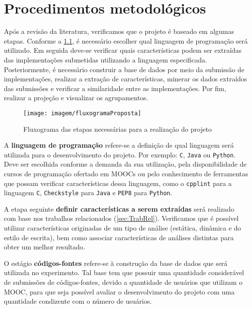 \chapter{Procedimentos metodológicos}
\label{chap:Proposta}

	Após a revisão da literatura, verificamos que o projeto é baseado em algumas etapas.
	Conforme a \cref{fig:fluxogramaProposta}, é necessário escolher qual linguagem de programação
	será utilizado. Em seguida deve-se verificar quais características podem ser extraídas
	das implementações submetidas utilizando a linguagem especificada. Posteriormente, é
	necessário construir a base de dados por meio da submissão de implementações, realizar
	a extração de características, minerar os dados extraídos das submissões e verificar a
	similaridade entre as implementações. Por fim, realizar a projeção e visualizar os
	agrupamentos.

	\begin{figure}[h]
		\centering
		\texttt{[image: imagem/fluxogramaProposta]}
		\caption{Fluxograma das etapas necessárias para a realização do projeto}
		\label{fig:fluxogramaProposta}
	\end{figure}

	A \textbf{linguagem de programação} refere-se a definição de qual linguagem será
	utilizada para o desenvolvimento do projeto. Por exemplo: \texttt{C}, \texttt{Java}
	ou \texttt{Python}. Deve ser escolhida conforme a demanda da sua utilização, pela
	disponibilidade de cursos de programação ofertado em \acs{MOOC}s ou pelo conhecimento de
	ferramentas que possam verificar características dessa linguagem, como o
	\texttt{cpplint} para a linguagem \texttt{C}, \texttt{Checkstyle} para
	\texttt{Java} e \texttt{PEP8} para \texttt{Python}.

	A etapa seguinte \textbf{definir características a serem extraídas} será realizado
	com base nos trabalhos relacionados (\cref{sec:TrabRel}). Verificamos que é
	possível utilizar características originadas de um tipo de análise (estática,
	dinâmica e do estilo de escrita), bem como associar características de análises
	distintas para obter um melhor resultado.
	
	O estágio \textbf{códigos-fontes} refere-se à construção da base de dados que será
	utilizada no experimento. Tal base tem que possuir uma quantidade considerável de
	submissões de códigos-fontes, devido a quantidade de usuários que utilizam o \acs{MOOC},
	para que seja possível avaliar o desenvolvimento do projeto com uma quantidade
	condizente com o número de usuários.
	

